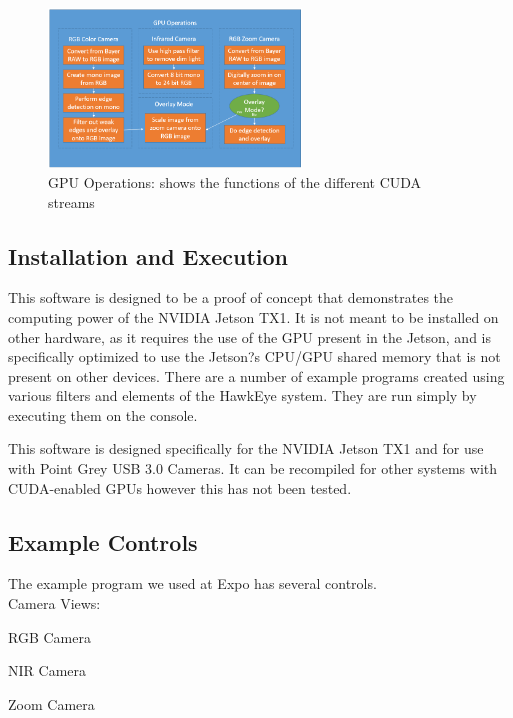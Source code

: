 \begin{figure}[H] 
	\centering
	\includegraphics[width=0.6\textwidth,natwidth=610,natheight=642]{images/GPU.png}
	\caption{GPU Operations: shows the functions of the different CUDA streams}  
	\end{figure}
	
\subsection{Installation and Execution}
This software is designed to be a proof of concept that demonstrates the computing power of the NVIDIA Jetson TX1. It is not meant to be installed on other hardware, as it requires the use of the GPU present in the Jetson, and is specifically optimized to use the Jetson?s CPU/GPU shared memory that is not present on other devices. There are a number of example programs created using various filters and elements of the HawkEye system. They are run simply by executing them on the console.
\par
This software is designed specifically for the NVIDIA Jetson TX1 and for use with Point Grey USB 3.0 Cameras. It can be recompiled for other systems with CUDA-enabled GPUs however this has not been tested.

\subsection {Example Controls}
The example program we used at Expo has several controls.\\

Camera Views:
\begin{description}[leftmargin=2cm,labelindent=2cm]
	\item[\[1\]] RGB Camera
	\item[\[2\]] NIR Camera
	\item[\[3\]] Zoom Camera\\
\end{description}

